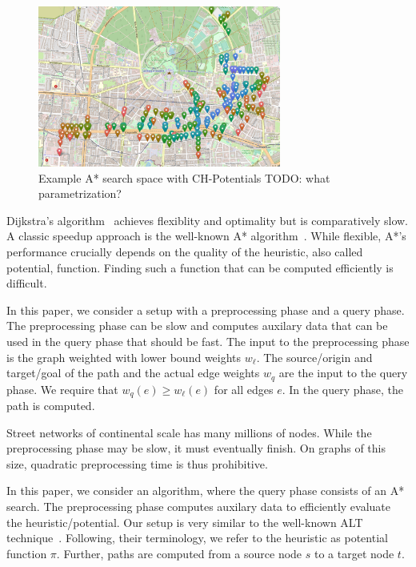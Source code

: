 \documentclass[letterpaper]{article} %
\begin{document}
\begin{figure}

\centering
\includegraphics[width=\columnwidth,height=200px]{fig/searchspace}


\caption{Example A* search space with CH-Potentials TODO: what parametrization?}
\label{img:search-space}
\end{figure}


Dijkstra's algorithm~\cite{d-ntpcg-59} achieves flexiblity and optimality but is comparatively slow.
A classic speedup approach is the well-known A* algorithm~\cite{hnr-afbhd-68}.
While flexible, A*'s performance crucially depends on the quality of the heuristic, also called potential, function.
Finding such a function that can be computed efficiently is difficult.

In this paper, we consider a setup with a preprocessing phase and a query phase.
The preprocessing phase can be slow and computes auxilary data that can be used in the query phase that should be fast.
The input to the preprocessing phase is the graph weighted with lower bound weights $w_\ell$.
The source/origin and target/goal of the path and the actual edge weights $w_q$ are the input to the query phase.
We require that $w_q(e)\ge w_\ell(e)$ for all edges $e$.
In the query phase, the path is computed.

Street networks of continental scale has many millions of nodes.
While the preprocessing phase may be slow, it must eventually finish.
On graphs of this size, quadratic preprocessing time is thus prohibitive.

In this paper, we consider an algorithm, where the query phase consists of an A* search.
The preprocessing phase computes auxilary data to efficiently evaluate the heuristic/potential.
Our setup is very similar to the well-known ALT technique~\cite{gh-cspas-05,DBLP:conf/wea/DellingW07}.
Following, their terminology, we refer to the heuristic as potential function $\pi$.
Further, paths are computed from a source node $s$ to a target node $t$.
\end{document}
